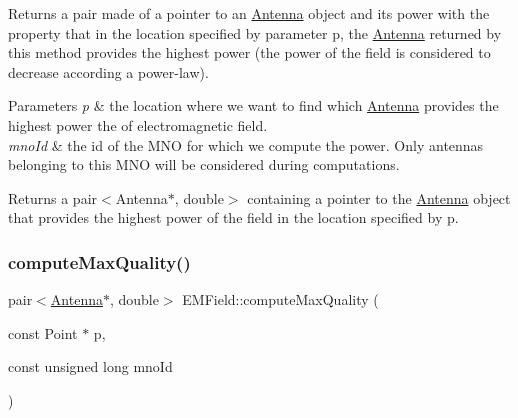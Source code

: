 Returns a pair made of a pointer to an \hyperlink{class_antenna}{Antenna} object and its power with the property that in the location specified by parameter p, the \hyperlink{class_antenna}{Antenna} returned by this method provides the highest power (the power of the field is considered to decrease according a power-\/law). 
\begin{DoxyParams}{Parameters}
{\em p} & the location where we want to find which \hyperlink{class_antenna}{Antenna} provides the highest power the of electromagnetic field. \\
\hline
{\em mno\+Id} & the id of the M\+NO for which we compute the power. Only antennas belonging to this M\+NO will be considered during computations. \\
\hline
\end{DoxyParams}
\begin{DoxyReturn}{Returns}
a pair$<$\+Antenna$\ast$, double$>$ containing a pointer to the \hyperlink{class_antenna}{Antenna} object that provides the highest power of the field in the location specified by p. 
\end{DoxyReturn}
\mbox{\label{class_e_m_field_ac866f6224e34895a0ee085c4baf43a01}} 
\subsubsection{\texorpdfstring{compute\+Max\+Quality()}{computeMaxQuality()}}
{\footnotesize\ttfamily pair$<$\hyperlink{class_antenna}{Antenna}$\ast$, double$>$ E\+M\+Field\+::compute\+Max\+Quality (\begin{DoxyParamCaption}\item[{const Point $\ast$}]{p,  }\item[{const unsigned long}]{mno\+Id }\end{DoxyParamCaption})}

